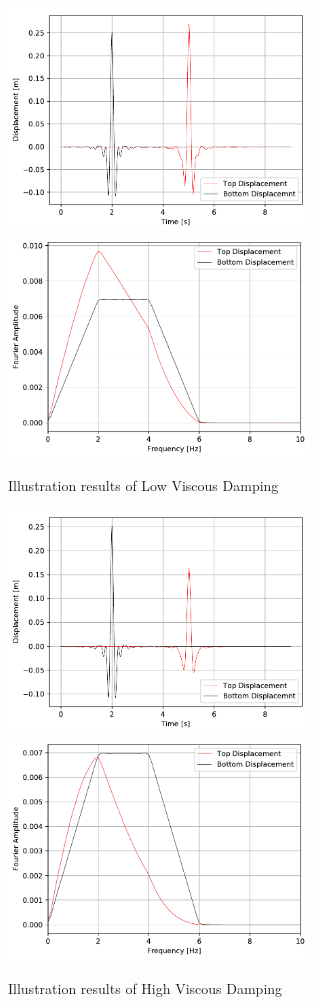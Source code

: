\begin{figure}[H]
  \centering
  \includegraphics[width = 8cm]{./Figure-files/Day3/Viscous_nonlinear_behavior/Rayleigh001Displacement.pdf}
  \includegraphics[width = 8cm]{./Figure-files/Day3/Viscous_nonlinear_behavior/Rayleigh001Displacement_Spectrum.pdf}
  \caption{Illustration results of Low Viscous Damping}
  \label{fig_day3_viscous_damping}
\end{figure}

\begin{figure}[H]
  \centering
  \includegraphics[width = 8cm]{./Figure-files/Day3/Viscous_nonlinear_behavior/Rayleigh002Displacement.pdf}
  \includegraphics[width = 8cm]{./Figure-files/Day3/Viscous_nonlinear_behavior/Rayleigh002Displacement_Spectrum.pdf}
  \caption{Illustration results of High Viscous Damping}
  \label{fig_day3_viscous_damping_high}
\end{figure}




